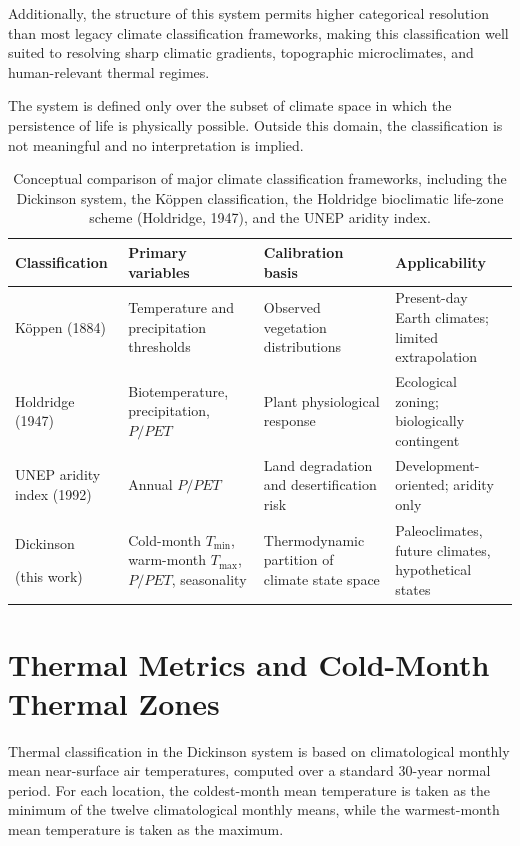 \documentclass[12pt]{article}
\begin{document}
Additionally, the structure of this system permits higher categorical resolution than most legacy climate classification frameworks, making this classification well suited to resolving sharp climatic gradients, topographic microclimates, and human-relevant thermal regimes.

The system is defined only over the subset of climate space in which the
persistence of life is physically possible. Outside this domain, the classification is not
meaningful and no interpretation is implied.

\begin{table}[htbp]
\centering
\caption{Conceptual comparison of major climate classification frameworks, including the Dickinson system, the Köppen classification, the Holdridge bioclimatic life-zone scheme (Holdridge, 1947), and the UNEP aridity index.
}
\renewcommand{\arraystretch}{1.35}
\begin{tabular}{|C{3.1cm}|C{3.8cm}|C{4.1cm}|C{3.8cm}|}
\hline
\textbf{Classification} &
\textbf{Primary variables} &
\textbf{Calibration basis} &
\textbf{Applicability} \\
\hline
Köppen (1884) &
Temperature and precipitation thresholds &
Observed vegetation distributions &
Present-day Earth climates; limited extrapolation \\
\hline
Holdridge (1947) &
Biotemperature, precipitation, $P/PET$ &
Plant physiological response &
Ecological zoning; biologically contingent \\
\hline
UNEP aridity index (1992) &
Annual $P/PET$ &
Land degradation and desertification risk &
Development-oriented; aridity only \\
\hline
Dickinson\par\vspace{0.2\baselineskip}(this work) &
Cold-month $T_{\min}$, warm-month $T_{\max}$, $P/PET$, seasonality &
Thermodynamic partition of climate state space &
Paleoclimates, future climates, hypothetical states \\
\hline
\end{tabular}
\end{table}

\section{Thermal Metrics and Cold-Month Thermal Zones}

Thermal classification in the Dickinson system is based on climatological
monthly mean near-surface air temperatures, computed over a standard
30-year normal period. For each location, the coldest-month mean
temperature is taken as the minimum of the twelve climatological monthly
means, while the warmest-month mean temperature is taken as the maximum.
\end{document}
